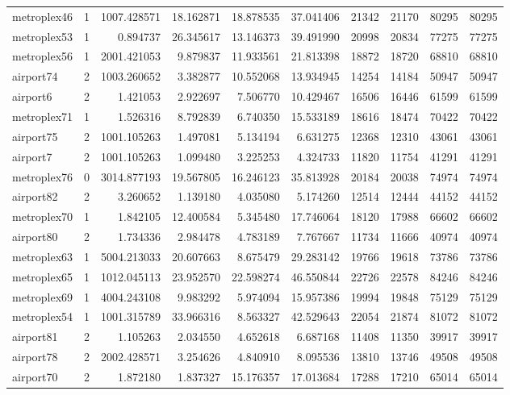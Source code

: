 \begin{longtable}{|l|r|r|r|r|r|r|r|r|r|}
metroplex46 & 1 & 1007.428571 & 18.162871 & 18.878535 & 37.041406 & 21342 & 21170 & 80295 & 80295 \\
metroplex53 & 1 & 0.894737 & 26.345617 & 13.146373 & 39.491990 & 20998 & 20834 & 77275 & 77275 \\
metroplex56 & 1 & 2001.421053 & 9.879837 & 11.933561 & 21.813398 & 18872 & 18720 & 68810 & 68810 \\
airport74 & 2 & 1003.260652 & 3.382877 & 10.552068 & 13.934945 & 14254 & 14184 & 50947 & 50947 \\
airport6 & 2 & 1.421053 & 2.922697 & 7.506770 & 10.429467 & 16506 & 16446 & 61599 & 61599 \\
metroplex71 & 1 & 1.526316 & 8.792839 & 6.740350 & 15.533189 & 18616 & 18474 & 70422 & 70422 \\
airport75 & 2 & 1001.105263 & 1.497081 & 5.134194 & 6.631275 & 12368 & 12310 & 43061 & 43061 \\
airport7 & 2 & 1001.105263 & 1.099480 & 3.225253 & 4.324733 & 11820 & 11754 & 41291 & 41291 \\
metroplex76 & 0 & 3014.877193 & 19.567805 & 16.246123 & 35.813928 & 20184 & 20038 & 74974 & 74974 \\
airport82 & 2 & 3.260652 & 1.139180 & 4.035080 & 5.174260 & 12514 & 12444 & 44152 & 44152 \\
metroplex70 & 1 & 1.842105 & 12.400584 & 5.345480 & 17.746064 & 18120 & 17988 & 66602 & 66602 \\
airport80 & 2 & 1.734336 & 2.984478 & 4.783189 & 7.767667 & 11734 & 11666 & 40974 & 40974 \\
metroplex63 & 1 & 5004.213033 & 20.607663 & 8.675479 & 29.283142 & 19766 & 19618 & 73786 & 73786 \\
metroplex65 & 1 & 1012.045113 & 23.952570 & 22.598274 & 46.550844 & 22726 & 22578 & 84246 & 84246 \\
metroplex69 & 1 & 4004.243108 & 9.983292 & 5.974094 & 15.957386 & 19994 & 19848 & 75129 & 75129 \\
metroplex54 & 1 & 1001.315789 & 33.966316 & 8.563327 & 42.529643 & 22054 & 21874 & 81072 & 81072 \\
airport81 & 2 & 1.105263 & 2.034550 & 4.652618 & 6.687168 & 11408 & 11350 & 39917 & 39917 \\
airport78 & 2 & 2002.428571 & 3.254626 & 4.840910 & 8.095536 & 13810 & 13746 & 49508 & 49508 \\
airport70 & 2 & 1.872180 & 1.837327 & 15.176357 & 17.013684 & 17288 & 17210 & 65014 & 65014 \\

\end{longtable}
